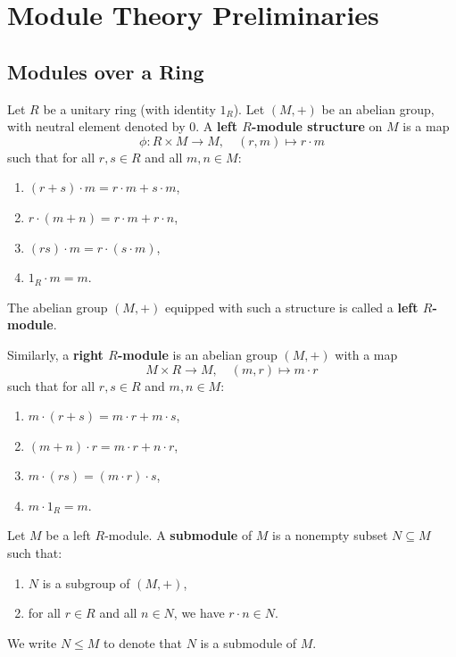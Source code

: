 \chapter{Module Theory Preliminaries}

\section{Modules over a Ring}

\begin{defn}
Let $R$ be a unitary ring (with identity $1_R$). Let $(M, +)$ be an abelian group, with neutral element denoted by $0$. A \textbf{left $R$-module structure} on $M$ is a map
\[
\phi: R \times M \to M, \quad (r, m) \mapsto r \cdot m
\]
such that for all $r, s \in R$ and all $m, n \in M$:
\begin{enumerate}
    \item $(r + s) \cdot m = r \cdot m + s \cdot m$,
    \item $r \cdot (m + n) = r \cdot m + r \cdot n$,
    \item $(rs) \cdot m = r \cdot (s \cdot m)$,
    \item $1_R \cdot m = m$.
\end{enumerate}
The abelian group $(M, +)$ equipped with such a structure is called a \textbf{left $R$-module}.
\end{defn}

\begin{defn}
Similarly, a \textbf{right $R$-module} is an abelian group $(M, +)$ with a map
\[
M \times R \to M, \quad (m, r) \mapsto m \cdot r
\]
such that for all $r, s \in R$ and $m, n \in M$:
\begin{enumerate}
    \item $m \cdot (r + s) = m \cdot r + m \cdot s$,
    \item $(m + n) \cdot r = m \cdot r + n \cdot r$,
    \item $m \cdot (rs) = (m \cdot r) \cdot s$,
    \item $m \cdot 1_R = m$.
\end{enumerate}
\end{defn}

\begin{defn}[Submodule]
Let $M$ be a left $R$-module. A \textbf{submodule} of $M$ is a nonempty subset $N \subseteq M$ such that:
\begin{enumerate}
    \item $N$ is a subgroup of $(M, +)$,
    \item for all $r \in R$ and all $n \in N$, we have $r \cdot n \in N$.
\end{enumerate}
We write $N \le M$ to denote that $N$ is a submodule of $M$.
\end{defn}

